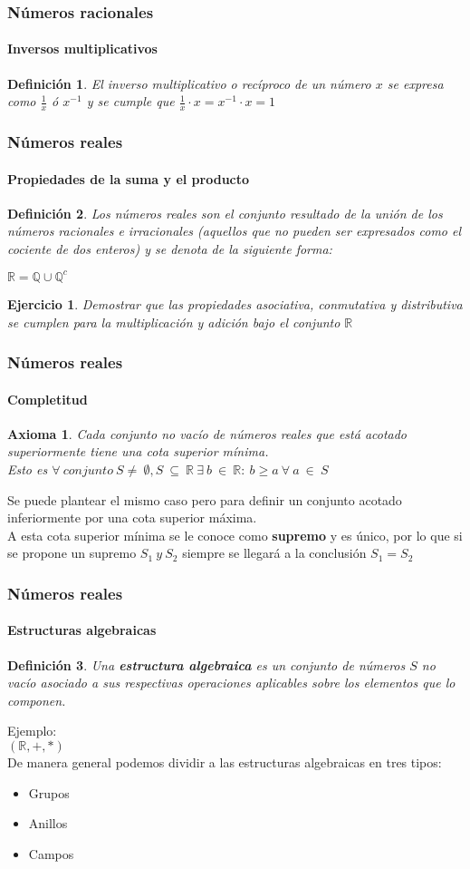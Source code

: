 \documentclass[11pt]{beamer}
\newtheorem{defi}{Definición}
\newtheorem{eje}{Ejercicio}
\newtheorem{axiom}{Axioma}
\begin{document}
\begin{frame}
\frametitle{Números racionales}
\framesubtitle{Inversos multiplicativos}
\begin{defi}
El inverso multiplicativo o recíproco de un número $x$ se expresa como $\frac{1}{x}$ ó $x^{-1}$ y se cumple que 
$\frac{1}{x} \cdot x = x^{-1} \cdot x = 1$
\end{defi}
\end{frame}

\begin{frame}
\frametitle{Números reales}
\framesubtitle{Propiedades de la suma y el producto}
\begin{defi}
Los números reales son el conjunto resultado de la unión de los números racionales e irracionales (aquellos que no 
pueden ser expresados como el cociente de dos enteros) y se denota de la siguiente forma:
\begin{center}
$\mathbb{R} = \mathbb{Q} \cup \mathbb{Q}^{c}$
\end{center}
\end{defi}
\begin{eje}
Demostrar que las propiedades asociativa, conmutativa y distributiva se cumplen para la multiplicación y adición bajo el 
conjunto $\mathbb{R}$ 
\end{eje}
\end{frame}

\begin{frame}
\frametitle{Números reales}
\framesubtitle{Completitud}
\begin{axiom}
Cada conjunto no vacío de números reales que está acotado superiormente tiene una cota superior mínima.
\\Esto es $\forall ~conjunto ~ S \neq ~ \emptyset, S~\subseteq~\mathbb{R}~\exists~b~\in~\mathbb{R}:~b\geqslant a~\forall~
a~\in~S$
\end{axiom}
Se puede plantear el mismo caso pero para definir un conjunto acotado inferiormente por una cota superior máxima.
\\A esta cota superior mínima se le conoce como \textbf{supremo} y es único, por lo que si se propone un supremo $S_1~y~S_2$
siempre se llegará a la conclusión $S_1 = S_2$
\end{frame}

\begin{frame}
\frametitle{Números reales}
\framesubtitle{Estructuras algebraicas}
\begin{defi}
Una \textbf{estructura algebraica} es un conjunto de números $S$ no vacío asociado a sus respectivas operaciones 
aplicables sobre los elementos que lo componen. 
\end{defi}
Ejemplo:
\\$(\mathbb{R},+,*)$ \hspace{2cm}
\\ 
De manera general podemos dividir a las estructuras algebraicas en tres tipos:
\begin{itemize}
\item Grupos
\item Anillos
\item Campos
\end{itemize}
\end{frame}
\end{document}
